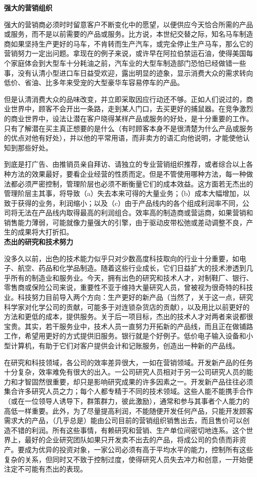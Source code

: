 \documentclass[UTF8,a4paper,zihao=-4,fontset = windows]{ctexart} %
\begin{document}
\textbf{强大的营销组织}


强大的营销商必须时时留意客户不断变化中的愿望，以便供应今天恰合所需的产品或服务，而不是以前需要的产品或服务。比方说，本世纪交替之际，知名马车制造商如果坚持生产更好的马车，不肯转而生产汽车，或完全停止生产马车，那么它的营销努力一定出问题。拿现在的例子来说，或许早在阿拉伯禁运石油，使得美国每个家庭体会到大型车十分耗油之前，汽车业的大型车制造部门恐怕已经做错一些事，没有认清小型进口车日益受欢迎，露出明显的迹象，显示消费大众的需求转向低价、省油、比多年来受宠的大型豪华车容易停车的产品。

但是认清消费大众的品味改变，并立即采取因应行动还不够。正如人们说过的，商业世界中，顾客不会开出一条路，走到某人门口，去买更好的捕鼠器。在竞争激烈的商业世界中，设法让潜在客户晓得某样产品或服务的好处，是十分重要的工作。只有了解潜在买主真正想要的是什么（有时顾客本身不是很清楚为什么产品或服务的优点对他有好处），并以他的平常用语，而非卖方的语汇向他说明，才能使他认知到那些好处。

到底是打广告、由推销员亲自拜访、请独立的专业营销组织推荐，或者综合以上各种方法的效果最好，要看企业经营的性质而定。但是不管使用哪种方法，每一种做法都必须严密控制，管理阶层也必须不断衡量它们的成本效益。这方面若无杰出的管理阶层主其事，将导致（a）失去本来可得的大量业务；（b）成本大幅增加，以致于获得的业务，利润缩小；以及（c）由于产品线内的各个组成利润率不同，公司将无法在产品线内取得最高的利润组合。效率高的制造商或营运商，如果营销和销售能力薄弱，可能就像力量强大的引擎，由于驱动皮带松弛或差动调整不良，产生的成果将大打折扣。
\\

\textbf{杰出的研究和技术努力}


没多久以前，出色的技术能力似乎只对少数高度科技取向的行业十分重要，如电子、航空、药品和化学品制造。随着这些行业成长，它们日益扩大的技术渗透到几乎所有的制造业和服务业。今天，拥有出色的研究和技术人才，对制鞋厂、银行、零售商或保险公司来说，重要性不亚于维持大量研究人员，曾被视为很奇特的科技业。科技努力目前导入两个方向：生产更好的新产品（当然了，关于这一点，研究科学家对化学公司的贡献，可能多于对连锁杂货店的贡献），以及用比以前更好的方法和更低的成本，提供服务。关于后一项目标，杰出的技术人才对两者来说都很宝贵。其实，若干服务业中，技术人员一直努力开拓新的产品线，而且正在做铺路工作，希望用更好的方式提供旧服务。银行就是个好例子。低价电子输入设备和小型计算机，有助于它们对客户提供会计和记账服务，创造出一种新的产品线。

在研究和科技领域，各公司的效率差异很大，一如在营销领域。开发新产品的任务十分复杂，效率难免有很大的出入。一公司研究人员相对于另一公司研究人员的能力和才智固然很重要，却只是影响研究成果的许多因素之一。开发新产品往往必须集合许多研究人员之力；每个人都专精于不同的技术领域。这些人能不能携手合作（或在一位领导人诱导下，群策群力，彼此激励），通常和参与其事者个人能力的高低一样重要。此外，为了尽量提高利润，不能随便开发任何产品，只能开发顾客需求大的产品，（几乎总是）能由公司目前的营销组织销售出去，而且售价可以创造不错的利润。所有这些事情，有赖研究和营销、生产单位间密切地连系。这个世界上，最好的企业研究团队如果只开发卖不出去的产品，将成公司的负债而非资产。要成为优异的投资对象，一家公司必须有高于平均水平的能力，控制所有这些复杂的关系，但同时又不致于控制过度，使得研究人员失去冲力和创意，一开始便注定不可能有杰出的表现。
\\
\end{document}
